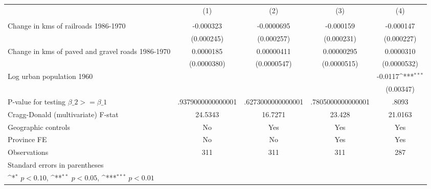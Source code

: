 {
\def\sym#1{\ifmmode^{#1}\else\(^{#1}\)\fi}
\begin{tabular}{l*{4}{c}}
\hline\hline
                &\multicolumn{1}{c}{(1)}&\multicolumn{1}{c}{(2)}&\multicolumn{1}{c}{(3)}&\multicolumn{1}{c}{(4)}\\
                &\multicolumn{1}{c}{}&\multicolumn{1}{c}{}&\multicolumn{1}{c}{}&\multicolumn{1}{c}{}\\
\hline
Change in kms of railroads 1986-1970&-0.000323         &-0.0000695         &-0.000159         &-0.000147         \\
                &(0.000245)         &(0.000257)         &(0.000231)         &(0.000227)         \\
[1em]
Change in kms of paved and gravel roads 1986-1970&0.0000185         &0.00000411         &0.00000295         &0.0000310         \\
                &(0.0000380)         &(0.0000547)         &(0.0000515)         &(0.0000532)         \\
[1em]
Log urban population 1960&                  &                  &                  &  -0.0117\sym{***}\\
                &                  &                  &                  &(0.00347)         \\
\hline
P-value for testing $\beta\_{2} >= \beta\_{1}$&.9379000000000001         &.6273000000000001         &.7805000000000001         &    .8093         \\
Cragg-Donald (multivariate) F-stat&  24.5343         &  16.7271         &   23.428         &  21.0163         \\
Geographic controls&       No         &      Yes         &      Yes         &      Yes         \\
Province FE     &       No         &       No         &      Yes         &      Yes         \\
Observations    &      311         &      311         &      311         &      287         \\
\hline\hline
\multicolumn{5}{l}{\footnotesize Standard errors in parentheses}\\
\multicolumn{5}{l}{\footnotesize \sym{*} \(p<0.10\), \sym{**} \(p<0.05\), \sym{***} \(p<0.01\)}\\
\end{tabular}
}
